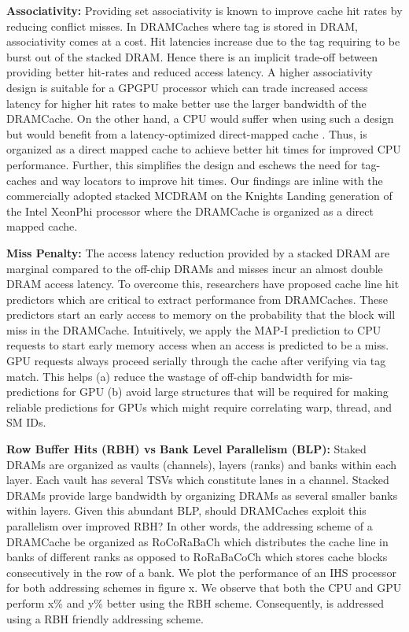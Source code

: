 \par \textbf{Associativity:} Providing set associativity is known to improve cache hit rates by reducing conflict misses. In DRAMCaches where tag is stored in DRAM,  associativity comes at a cost. Hit latencies increase due to the tag requiring to be burst out of the stacked DRAM. Hence there is an implicit trade-off between providing better hit-rates and reduced access latency. A higher associativity design is suitable for a GPGPU processor which can trade increased access latency for higher hit rates to make better use the larger bandwidth of the DRAMCache. On the other hand, a CPU would suffer when using such a design but would benefit from a latency-optimized direct-mapped cache \cite{alloy}. Thus, \cachename is organized as a direct mapped cache to achieve better hit times for improved CPU performance. Further, this simplifies the design and eschews the need for tag-caches \cite{atcache} and way locators \cite{bimodal} to improve hit times. Our findings are inline with the commercially adopted stacked MCDRAM on the Knights Landing generation of the Intel XeonPhi processor \cite{xeonphi} where the DRAMCache is organized as a direct mapped cache.
\par \textbf{Miss Penalty:} The access latency reduction provided by a stacked DRAM are marginal compared to the off-chip DRAMs and misses incur an almost double DRAM access latency. To overcome this, researchers have proposed cache line hit predictors \cite{loh-hill,alloy} which are critical to extract performance from DRAMCaches. These predictors start an early access to memory on the probability that the block will miss in the DRAMCache. Intuitively, we apply the MAP-I prediction \cite{alloy} to CPU requests to start early memory access when an access is predicted to be a miss. GPU requests always proceed serially through the cache after verifying via tag match. This helps (a) reduce the wastage of off-chip bandwidth for mis-predictions for GPU (b) avoid large structures that will be required for making reliable predictions for GPUs which might require correlating warp, thread, and SM IDs.
\par \textbf{Row Buffer Hits (RBH) vs Bank Level Parallelism (BLP):} Staked DRAMs are organized as vaults (channels), layers (ranks) and banks within each layer. Each vault has several TSVs which constitute lanes in a channel. Stacked DRAMs provide large bandwidth by organizing DRAMs as several smaller banks within layers. Given this abundant BLP, should DRAMCaches exploit this parallelism over improved RBH? In other words, the addressing scheme of a DRAMCache be organized as RoCoRaBaCh which distributes the cache line in banks of different ranks as opposed to RoRaBaCoCh which stores cache blocks consecutively in the row of a bank. We plot the performance of an IHS processor for both addressing schemes in figure x. We observe that both the CPU and GPU perform x\% and y\% better using the RBH scheme. Consequently, \cachename is addressed using a RBH friendly addressing scheme.
